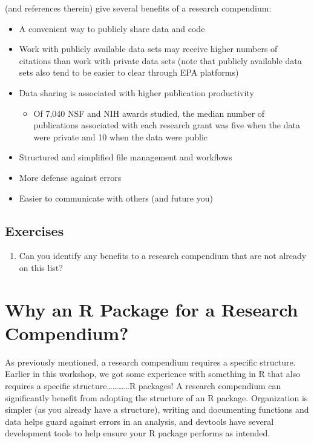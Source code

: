 \documentclass[
]{book}
\providecommand{\tightlist}{%
  \setlength{\itemsep}{0pt}\setlength{\parskip}{0pt}}
\begin{document}
\citet{marwick2018packaging} (and references therein) give several benefits of a research compendium:

\begin{itemize}
\tightlist
\item
  A convenient way to publicly share data and code
\item
  Work with publicly available data sets may receive higher numbers of citations than work with private data sets (note that publicly available data sets also tend to be easier to clear through EPA platforms)
\item
  Data sharing is associated with higher publication productivity

  \begin{itemize}
  \tightlist
  \item
    Of 7,040 NSF and NIH awards studied, the median number of publications associated with each research grant was five when the data were private and 10 when the data were public
  \end{itemize}
\item
  Structured and simplified file management and workflows
\item
  More defense against errors
\item
  Easier to communicate with others (and future you)
\end{itemize}

\hypertarget{exercises-6}{%
\subsection{Exercises}\label{exercises-6}}

\begin{enumerate}
\def\labelenumi{\arabic{enumi}.}
\tightlist
\item
  Can you identify any benefits to a research compendium that are not already on this list?
\end{enumerate}

\hypertarget{why-an-r-package-for-a-research-compendium}{%
\section{Why an R Package for a Research Compendium?}\label{why-an-r-package-for-a-research-compendium}}

As previously mentioned, a research compendium requires a specific structure. Earlier in this workshop, we got some experience with something in R that also requires a specific structure\ldots\ldots\ldots\ldots R packages! A research compendium can significantly benefit from adopting the structure of an R package. Organization is simpler (as you already have a structure), writing and documenting functions and data helps guard against errors in an analysis, and devtools have several development tools to help ensure your R package performs as intended.
\end{document}
